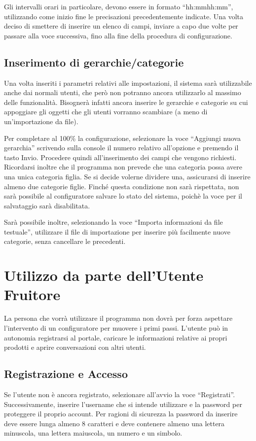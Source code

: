 Gli intervalli orari in particolare, devono essere in formato ``hh:mm\-hh:mm'', utilizzando come inizio fine le precisazioni precedentemente indicate.
Una volta deciso di smettere di inserire un elenco di campi, inviare a capo due volte per passare alla voce successiva, fino alla fine della procedura di configurazione.

\subsection{Inserimento di gerarchie/categorie}
Una volta inseriti i parametri relativi alle impostazioni, il sistema sarà utilizzabile anche dai normali utenti, che però non potranno ancora utilizzarlo al massimo delle funzionalità.
Bisognerà infatti ancora inserire le gerarchie e categorie su cui appoggiare gli oggetti che gli utenti vorranno scambiare (a meno di un'importazione da file).

Per completare al 100\% la configurazione, selezionare la voce ``Aggiungi nuova gerarchia'' scrivendo sulla console il numero relativo all'opzione e premendo il tasto Invio.
Procedere quindi all'inserimento dei campi che vengono richiesti.
Ricordarsi inoltre che il programma non prevede che una categoria possa avere una unica categoria figlia. Se si decide volerne dividere una, assicurarsi di inserire almeno due categorie figlie.
Finché questa condizione non sarà rispettata, non sarà possibile al configuratore salvare lo stato del sistema, poichè la voce per il salvataggio sarà disabilitata.

Sarà possibile inoltre, selezionando la voce ``Importa informazioni da file testuale'', utilizzare il file di importazione per inserire più facilmente nuove categorie, senza cancellare le precedenti.

\section{Utilizzo da parte dell'Utente Fruitore}

La persona che vorrà utilizzare il programma non dovrà per forza aspettare l'intervento di un configuratore per muovere i primi passi. L'utente può in autonomia registrarsi al portale, caricare le informazioni
relative ai propri prodotti e aprire conversazioni con altri utenti.

\subsection{Registrazione e Accesso}
Se l'utente non è ancora registrato, selezionare all'avvio la voce ``Registrati''. Successivamente, inserire l'username che si intende utilizzare e la password per proteggere il proprio account.
Per ragioni di sicurezza la password da inserire deve essere lunga almeno 8 caratteri e deve contenere almeno una lettera minuscola, una lettera maiuscola, un numero e un simbolo.

